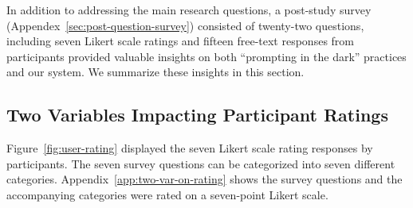 In addition to addressing the main research questions, a post-study survey (Appendex~\ref{sec:post-question-survey}) consisted of twenty-two questions, including seven Likert scale ratings and fifteen free-text responses from participants provided valuable insights on both ``prompting in the dark'' practices and our system.
We summarize these insights in this section.


\subsection{Two Variables Impacting Participant Ratings\label{sec:two-var-on-rating}}
Figure~\ref{fig:user-rating} displayed the seven Likert scale rating responses by participants. The seven survey questions can be categorized into seven different categories. 
Appendix~\ref{app:two-var-on-rating} shows
the survey questions and the accompanying categories were rated on a seven-point Likert scale. 

\begin{comment}


listed below:

\begin{itemize}
    \item 
    \textbf{(Q1) Understandable}: The annotation task was easy to understand.

    \item
    \textbf{(Q2) Ease of Use}: The annotation tool is easy to use.

    \item
    \textbf{(Q4) Intuitive System}: The interface of the annotation system is intuitive.

    \item
    \textbf{(Q5) Performance Satisfaction}: How satisfied are you with the performance of the system?

    \item
    \textbf{(Q6) Prompt Improvement}: This tool was helpful in improving my prompt. 
    
    \item
    \textbf{(Q7) Process Efficiency}: Using this tool made the process of prompt engineering more efficient.

    \item
    \textbf{(Q19) Task Completion}: I completed the annotation tasks efficiently.

\end{itemize}
    
\end{comment}

